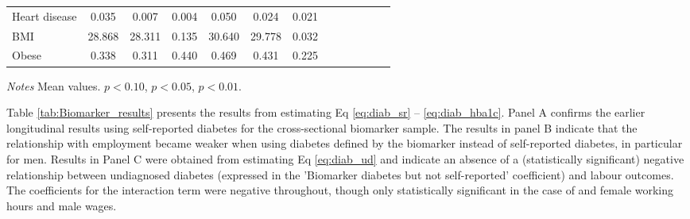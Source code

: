 \documentclass[10pt,letterpaper]{article}
\begin{document}
\begin{table}[!ht]
\begin{center}
\begin{adjustbox}{max width=\linewidth}
\begin{threeparttable}
{\begin{tabular}{l*{6}{S S}}
						Heart disease       &       0.035&       0.007&       0.004&       0.050&       0.024&       0.021\\
						BMI     &      28.868&      28.311&       0.135&      30.640&      29.778&       0.032\\
						Obese&       0.338&       0.311&       0.440&       0.469&       0.431&       0.225\\
						\bottomrule
					\end{tabular}
					\begin{tablenotes}
						\item \footnotesize \textit{Notes} Mean values. \sym{*} \(p<0.10\), \sym{**} \(p<0.05\), \sym{***} \(p<0.01\).
					\end{tablenotes}
				}
			\end{threeparttable}
		\end{adjustbox}
	\end{center}
\end{table}


Table \ref{tab:Biomarker_results} presents the results from estimating Eq \ref{eq:diab_sr} -- \ref{eq:diab_hba1c}. Panel A confirms the earlier longitudinal results using self-reported diabetes for the cross-sectional biomarker sample. The results in panel B indicate that the relationship with employment became weaker when using diabetes defined by the biomarker instead of self-reported diabetes, in particular for men. Results in Panel C were obtained from estimating Eq \ref{eq:diab_ud} and indicate an absence of a (statistically significant) negative relationship between undiagnosed diabetes (expressed in the 'Biomarker diabetes but not self-reported' coefficient) and labour outcomes. The coefficients for the interaction term were negative throughout, though only statistically significant in the case of  and female working hours and male wages. 
\end{document}
